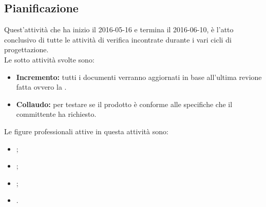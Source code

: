 \documentclass[12pt,a4paper]{article}
\begin{document}
\subsection{Pianificazione}
Quest'attività che ha inizio il 2016-05-16 e termina il 2016-06-10, è l'atto conclusivo di tutte le attività di verifica incontrate durante i vari cicli di progettazione.
\\Le sotto attività svolte sono:
\begin{itemize}
	\item \textbf{Incremento:} tutti i documenti verranno aggiornati in base all'ultima revione fatta ovvero la \RQ.
	\item \textbf{Collaudo:} per testare se il prodotto è conforme alle specifiche che il committente ha richiesto.
\end{itemize}
Le figure professionali attive in questa attività sono:
\begin{itemize}
	\item \PM;
	\item \AM;
	\item \PG;
	\item \VR.
\end{itemize}
\newpage
\end{document}
